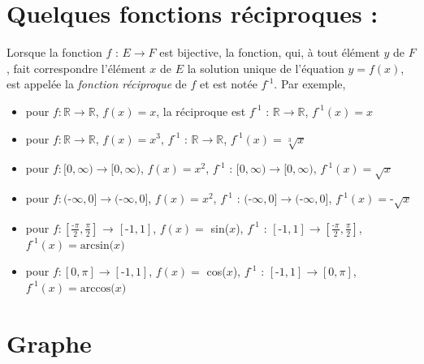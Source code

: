 \section{Quelques fonctions réciproques :}
Lorsque la fonction $f$ : $E \to F$ est bijective, la fonction, qui, à tout élément $y$ de $F$, fait correspondre l’élément $x$ de $E$ la solution unique de l’équation
$y = f(x)$, est appelée la \textit{fonction réciproque} de $f$ et est notée $f^{\text{-}1}$.
Par exemple, 
\begin{itemize}
\item pour $f : \mathbb{R} \to \mathbb{R}$, $f(x) = x$, la réciproque est $f^{\text{-}1}$ :  $\mathbb{R} \to \mathbb{R}$, $f^{\text{-}1}(x) = x$
    \item pour $f : \mathbb{R} \to \mathbb{R}$, $f(x) = x^3$,  $f^{\text{-}1}$ :  $\mathbb{R} \to \mathbb{R}$, $f^{\text{-}1}(x) = \sqrt[3]{x}$
        \item pour $f : [0, \infty) \to [0, \infty)$, $f(x) = x^2$, $f^{\text{-}1}$ :  $[0, \infty) \to [0, \infty)$, $f^{\text{-}1}(x) = \sqrt{x}$
        \item pour $f : (\text{-}\infty, 0] \to (\text{-}\infty, 0]$, $f(x) = x^2$,  $f^{\text{-}1}$ :  $(\text{-}\infty, 0] \to (\text{-}\infty, 0]$, $f^{\text{-}1}(x) = \text{-}\sqrt{x}$
        \item pour $f : [\frac{\text{-}\pi}{2}, \frac{\pi}{2}]$ → $[\text{-}1, 1]$, $f(x) =$ sin($x$),  $f^{\text{-}1}$ :  $[\text{-}1, 1] \to [\frac{\text{-}\pi}{2}, \frac{\pi}{2}]$, $f^{\text{-}1}(x) = \text{arcsin(}x)$
         \item pour $f : [0, \pi] \to [\text{-}1, 1]$, $f(x) =$ cos($x$),  $f^{\text{-}1}$ :  $[\text{-}1, 1] \to [0, \pi]$, $f^{\text{-}1}(x) = \text{arccos(}x)$
        
\end{itemize}



\section{Graphe}

